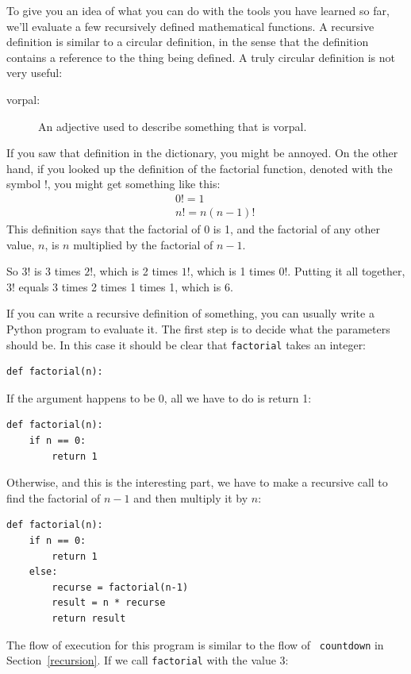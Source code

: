 \documentclass[10pt]{book}
\begin{document}
To give you an idea of what you can do with the tools you have learned
so far, we'll evaluate a few recursively defined mathematical
functions.  A recursive definition is similar to a circular
definition, in the sense that the definition contains a reference to
the thing being defined.  A truly circular definition is not very
useful:

\begin{description}

\item[vorpal:] An adjective used to describe something that is vorpal.

\end{description}

If you saw that definition in the dictionary, you might be annoyed. On
the other hand, if you looked up the definition of the factorial
function, denoted with the symbol $!$, you might get something like
this:
%
\begin{eqnarray*}
&&  0! = 1 \\
&&  n! = n (n-1)!
\end{eqnarray*}
%
This definition says that the factorial of 0 is 1, and the factorial
of any other value, $n$, is $n$ multiplied by the factorial of $n-1$.

So $3!$ is 3 times $2!$, which is 2 times $1!$, which is 1 times
$0!$. Putting it all together, $3!$ equals 3 times 2 times 1 times 1,
which is 6.

If you can write a recursive definition of something, you can usually
write a Python program to evaluate it. The first step is to decide
what the parameters should be.  In this case it should be clear
that {\tt factorial} takes an integer:

\begin{verbatim}
def factorial(n):
\end{verbatim}
%
If the argument happens to be 0, all we have to do is return 1:

\begin{verbatim}
def factorial(n):
    if n == 0:
        return 1
\end{verbatim}
%
Otherwise, and this is the interesting part, we have to make a
recursive call to find the factorial of $n-1$ and then multiply it by
$n$:

\begin{verbatim}
def factorial(n):
    if n == 0:
        return 1
    else:
        recurse = factorial(n-1)
        result = n * recurse
        return result
\end{verbatim}
%
The flow of execution for this program is similar to the flow of {\tt
countdown} in Section~\ref{recursion}.  If we call {\tt factorial}
with the value 3:
\end{document}
